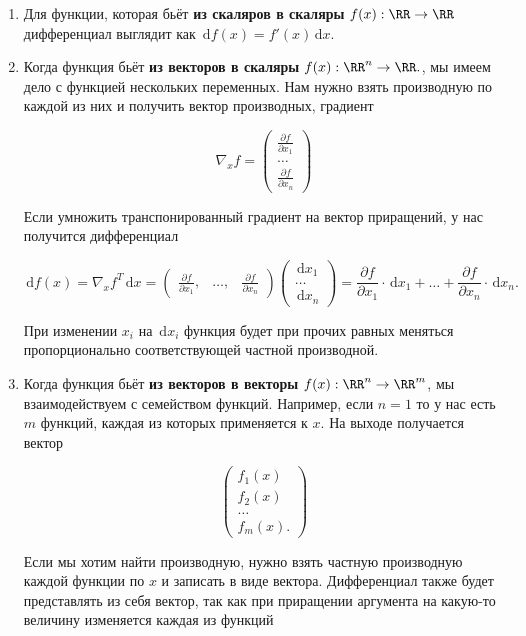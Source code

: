 \documentclass[12pt,fleqn]{article}
\newcommand{\dx}[1]{\,\mathrm{d}#1} %
\begin{document}
\begin{enumerate}
\item  Для функции, которая бьёт \textbf{из скаляров в скаляры} $f(x) : \RR \to \RR$ дифференциал выглядит как $\dx{f(x)} = f'(x) \dx{x}.$ 

\item Когда функция бьёт \textbf{из векторов в скаляры} $f(x) : \RR^n \to \RR.$, мы имеем дело с функцией нескольких переменных. Нам нужно взять производную по каждой из них и получить вектор производных, градиент

\[
\nabla_x f = \begin{pmatrix} \frac{\partial f}{\partial x_1} \\ \ldots  \\ \frac{\partial f}{\partial x_n} \end{pmatrix}
\]

Если умножить транспонированный градиент на вектор приращений, у нас получится дифференциал

\[
\dx{f(x)} = \nabla_x f^T \dx{x} = \begin{pmatrix} \frac{\partial f}{\partial x_1}, & \ldots,  & \frac{\partial f}{\partial x_n} \end{pmatrix} \begin{pmatrix} \dx{x_1} \\  \ldots  \\ \dx{x_n} \end{pmatrix} = \frac{\partial f}{\partial x_1} \cdot \dx{x_1} + \ldots +\frac{\partial f}{\partial x_n} \cdot \dx{x_n}.
\]

При изменении $x_i$ на $\dx{x_i}$ функция будет при прочих равных меняться пропорционально соответствующей частной производной. 

\item Когда функция бьёт \textbf{из векторов в векторы} $f(x) : \RR^n \to \RR^m$, мы взаимодействуем с семейством функций. Например, если $n=1$ то у нас есть $m$ функций, каждая из которых применяется к $x$. На выходе получается вектор 

\[
\begin{pmatrix} f_1(x) \\ f_2(x) \\ \ldots  \\ f_m(x). \end{pmatrix}
\]

Если мы хотим найти производную, нужно взять частную производную каждой функции по $x$ и записать в виде вектора. Дифференциал также будет представлять из себя вектор, так как при приращении аргумента на какую-то величину изменяется каждая из функций 


\end{enumerate}
\end{document}

